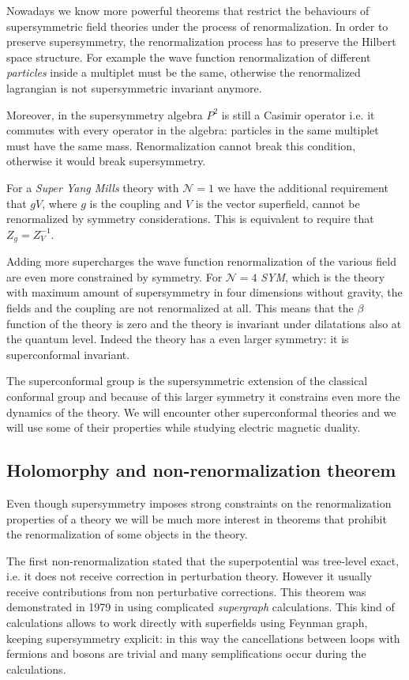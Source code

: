 Nowadays we know more powerful theorems that restrict the behaviours of supersymmetric field theories under the process of renormalization.
In order to preserve supersymmetry, the renormalization process has to preserve the Hilbert space structure. For example the wave function renormalization of different \emph{ particles} inside a multiplet must be the same, otherwise the renormalized lagrangian is not supersymmetric invariant anymore. 

Moreover, in the supersymmetry algebra $P^2$ is still a Casimir operator i.e. it commutes with every operator in the algebra: particles in the same multiplet must have the same mass.
Renormalization cannot break this condition, otherwise it would break supersymmetry.

For a \emph{Super Yang Mills} theory with $\mathcal{N} = 1$ we have the additional requirement that $g V$, where $g$ is the coupling and $V$ is the vector superfield, cannot be renormalized by symmetry considerations. This is equivalent to require that 
$ Z_g = Z_V^{-1}$.

Adding more supercharges the wave function renormalization of the various field are even more constrained by symmetry.
For $\mathcal{N}=4$ \emph{SYM}, which is the  theory with maximum amount of supersymmetry in four dimensions without gravity, the fields and the coupling are not renormalized at all.
This means that the $\beta$ function of the theory is zero and the theory is invariant under dilatations also at the quantum level.
Indeed the theory has a even larger symmetry: it is superconformal invariant.

The superconformal group is the supersymmetric extension of the classical conformal group and because of this larger symmetry it constrains even more the dynamics of the theory. 
We will encounter other superconformal theories and we will use some of their properties while studying electric magnetic duality. 


\subsection{Holomorphy and non-renormalization theorem}
Even though supersymmetry imposes strong constraints on the renormalization properties of a theory we will be much more interest in theorems that prohibit the renormalization of some objects in the theory.

The first non-renormalization stated that the superpotential was tree-level exact, i.e. it does not receive correction in perturbation theory. However it usually receive contributions from non perturbative corrections.
This theorem was demonstrated in 1979 in \cite{Grisaru:1979wc} using complicated \emph{supergraph} calculations.
This kind of calculations allows to work directly with superfields using Feynman graph, keeping supersymmetry explicit: in this way the cancellations between loops with fermions and bosons are trivial and many semplifications occur during the calculations.

